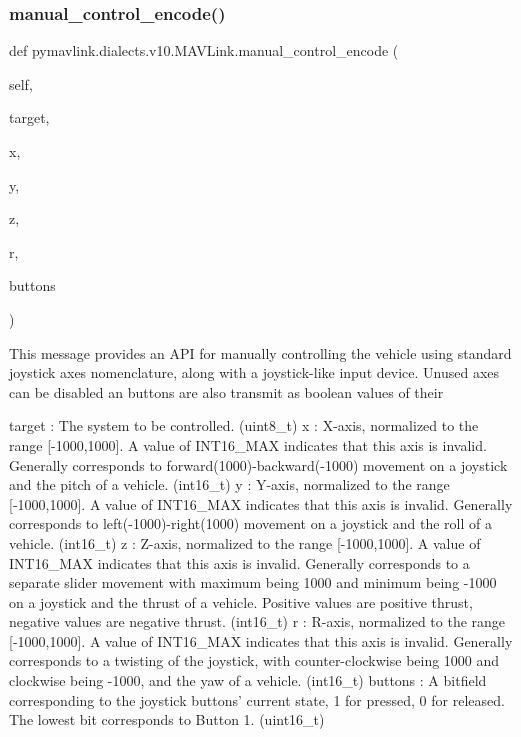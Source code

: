 \begin{DoxyVerb}
\begin{DoxyVerb}
\begin{DoxyVerb}
\begin{DoxyVerb}
\subsubsection{\texorpdfstring{manual\+\_\+control\+\_\+encode()}{manual\_control\_encode()}}
{\footnotesize\ttfamily def pymavlink.\+dialects.\+v10.\+M\+A\+V\+Link.\+manual\+\_\+control\+\_\+encode (\begin{DoxyParamCaption}\item[{}]{self,  }\item[{}]{target,  }\item[{}]{x,  }\item[{}]{y,  }\item[{}]{z,  }\item[{}]{r,  }\item[{}]{buttons }\end{DoxyParamCaption})}

\begin{DoxyVerb}This message provides an API for manually controlling the vehicle
using standard joystick axes nomenclature, along with
a joystick-like input device. Unused axes can be
disabled an buttons are also transmit as boolean
values of their

target                    : The system to be controlled. (uint8_t)
x                         : X-axis, normalized to the range [-1000,1000]. A value of INT16_MAX indicates that this axis is invalid. Generally corresponds to forward(1000)-backward(-1000) movement on a joystick and the pitch of a vehicle. (int16_t)
y                         : Y-axis, normalized to the range [-1000,1000]. A value of INT16_MAX indicates that this axis is invalid. Generally corresponds to left(-1000)-right(1000) movement on a joystick and the roll of a vehicle. (int16_t)
z                         : Z-axis, normalized to the range [-1000,1000]. A value of INT16_MAX indicates that this axis is invalid. Generally corresponds to a separate slider movement with maximum being 1000 and minimum being -1000 on a joystick and the thrust of a vehicle. Positive values are positive thrust, negative values are negative thrust. (int16_t)
r                         : R-axis, normalized to the range [-1000,1000]. A value of INT16_MAX indicates that this axis is invalid. Generally corresponds to a twisting of the joystick, with counter-clockwise being 1000 and clockwise being -1000, and the yaw of a vehicle. (int16_t)
buttons                   : A bitfield corresponding to the joystick buttons' current state, 1 for pressed, 0 for released. The lowest bit corresponds to Button 1. (uint16_t)\end{DoxyVerb}
 \mbox{\label{classpymavlink_1_1dialects_1_1v10_1_1MAVLink_aefb5e7c39173cdfaa3ff7fe746b22a85}} 

\end{DoxyVerb}
\end{DoxyVerb}
\end{DoxyVerb}
\end{DoxyVerb}

